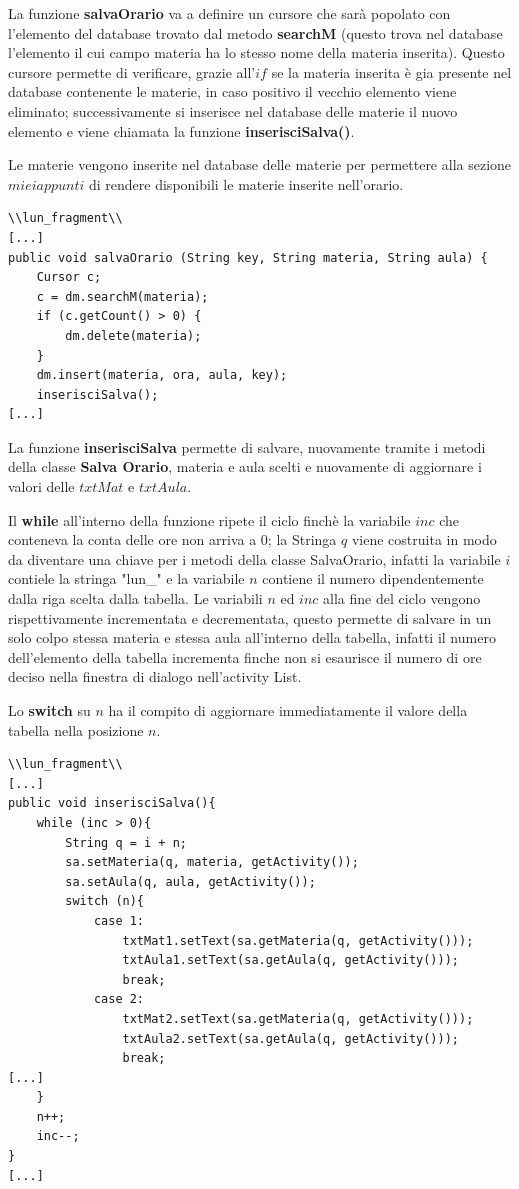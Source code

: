 \documentclass[a4paper, 50pt, twoside]{article}
\begin{document}
La funzione \textbf{salvaOrario} va a definire un cursore che sarà popolato con l'elemento del database trovato dal metodo \textbf{searchM} (questo trova nel database l'elemento il cui campo materia ha lo stesso nome della materia inserita).
Questo cursore permette di verificare, grazie all'$if$ se la materia inserita è gia presente nel database contenente le materie, in caso positivo il vecchio elemento viene eliminato; successivamente si inserisce nel database delle materie il nuovo elemento e viene chiamata la funzione \textbf{inserisciSalva()}.

Le materie vengono inserite nel database delle materie per permettere alla sezione $miei appunti$ di rendere disponibili le materie inserite nell'orario.

\begin{lstlisting}
\\lun_fragment\\
[...]
public void salvaOrario (String key, String materia, String aula) {
	Cursor c;
	c = dm.searchM(materia);
	if (c.getCount() > 0) {
		dm.delete(materia);
	}
	dm.insert(materia, ora, aula, key);
	inserisciSalva();
[...]
\end{lstlisting}

La funzione \textbf{inserisciSalva} permette di salvare, nuovamente tramite i metodi della classe \textbf{Salva Orario}, materia e aula scelti e nuovamente di aggiornare i valori delle $txtMat$ e $txtAula$.

Il \textbf{while} all'interno della funzione ripete il ciclo finchè la variabile $inc$ che conteneva la conta delle ore non arriva a 0; la Stringa $q$ viene costruita in modo da diventare una chiave per i metodi della classe SalvaOrario, infatti la variabile $i$ contiele la stringa "lun\_" e la variabile $n$ contiene il numero dipendentemente dalla riga scelta dalla tabella. Le variabili $n$ ed $inc$ alla fine del ciclo vengono rispettivamente incrementata e decrementata, questo permette di salvare in un solo colpo stessa materia e stessa aula all'interno della tabella, infatti il numero dell'elemento della tabella incrementa finche non si esaurisce il numero di ore deciso nella finestra di dialogo nell'activity List.

Lo \textbf{switch} su $n$ ha il compito di aggiornare immediatamente il valore della tabella nella posizione $n$.
\begin{lstlisting}
\\lun_fragment\\
[...]
public void inserisciSalva(){
	while (inc > 0){
		String q = i + n;
		sa.setMateria(q, materia, getActivity());
		sa.setAula(q, aula, getActivity());
		switch (n){
			case 1:
				txtMat1.setText(sa.getMateria(q, getActivity()));
				txtAula1.setText(sa.getAula(q, getActivity()));
				break;
			case 2:
				txtMat2.setText(sa.getMateria(q, getActivity()));
				txtAula2.setText(sa.getAula(q, getActivity()));
				break;
[...]
	}
	n++;
	inc--;
}
[...]
\end{lstlisting}
\end{document}
